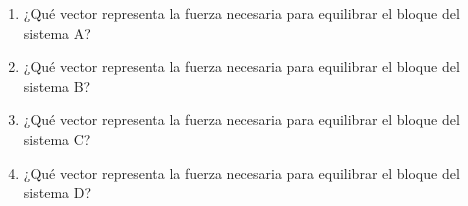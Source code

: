 \documentclass[11pt]{book}
\begin{document}
\begin{itemize}
\begin{boxK}
\begin{figure}[H]
              \end{figure}
              \begin{enumerate}
                  \item ¿Qué vector representa la fuerza necesaria para equilibrar el bloque del sistema A?\\
                  \item ¿Qué vector representa la fuerza necesaria para equilibrar el bloque del sistema B?\\
                  \item ¿Qué vector representa la fuerza necesaria para equilibrar el bloque del sistema C?\\
                  \item ¿Qué vector representa la fuerza necesaria para equilibrar el bloque del sistema D?\\
              \end{enumerate}
          \end{boxK}
\end{itemize}
\newpage
\end{document}
